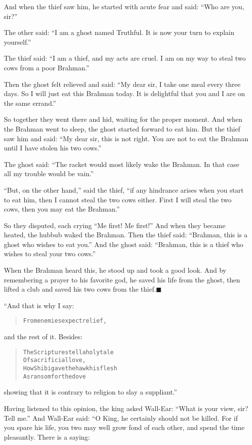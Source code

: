 \documentclass[article, twoside, 14pt]{memoir}
\newcommand{\qed}{\hfill \ensuremath{\blacksquare}}
\renewenvironment{verbatim}{%
\begin{quote}%
\vskip -10pt%
\begin{alltt}\normalfont\large}{\end{alltt}%
\end{quote}%
\vskip -10pt
} %
\begin{document}
And when the thief saw him, he started with acute fear and said:
``Who are you, sir?''

The other said:
``I am a ghost named Truthful. It is now your turn to explain yourself.''

The thief said:
``I am a thief, and my acts are cruel. I am on my way to steal two cows from a poor Brahman.''

Then the ghost felt relieved and said:
``My dear sir, I take one meal every three days. So I will just eat this Brahman today. It is delightful that you and I are on the same errand.''

So together they went there and hid, waiting for the proper moment.
And when the Brahman went to sleep, the ghost started forward to
eat him. But the thief saw him and said:
``My dear sir, this is not right. You are not to eat the Brahman until I have stolen his two cows.''

The ghost said:
``The racket would most likely wake the Brahman. In that case all my trouble would be vain.''

``But, on the other hand,'' said the thief,
``if any hindrance arises when you start to eat him, then I cannot steal the two cows either. First I will steal the two cows, then you may eat the Brahman.''

So they disputed, each crying ``Me first! Me first!'' And when they
became heated, the hubbub waked the Brahman. Then the thief said:
``Brahman, this is a ghost who wishes to eat you.'' And the ghost
said:
``Brahman, this is a thief who wishes to steal your two cows.''

When the Brahman heard this, he stood up and took a good look. And
by remembering a prayer to his favorite god, he saved his life from
the ghost, then lifted a club and saved his two cows from the
thief.\hyperref[s57]{\qed}

“And that is why I say:

\begin{verbatim}
From enemies expect relief,
\end{verbatim}
and the rest of it. Besides:

\begin{verbatim}
The Scriptures tell a holy tale
    Of sacrificial love,
How Shibi gave the hawk his flesh
    As ransom for the dove{\textemdash}
\end{verbatim}
showing that it is contrary to religion to slay a suppliant.”

Having listened to this opinion, the king asked Wall-Ear:
``What is your view, sir? Tell me.'' And Wall-Ear said: “O King, he
certainly should not be killed. For if you spare his life, you two
may well grow fond of each other, and spend the time pleasantly.
There is a saying:
\end{document}
